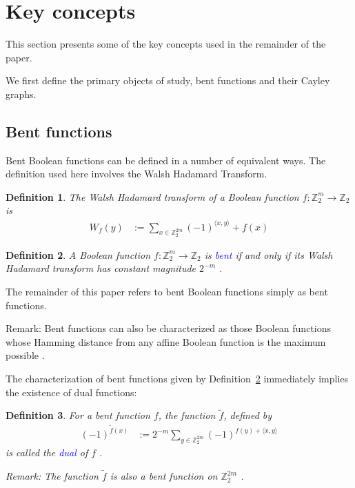 \documentclass[12pt,a4paper]{article}
\newcommand{\mb}[1]{\mathbb{#1}}
\newcommand{\Z}{\mb{Z}}
\newcommand{\To}{\rightarrow}
\newcommand{\Emph}[1]{\emph{\textcolor{blue}{#1}}}
\newcommand{\dual}[1]{\widetilde{#1}}
\newtheorem{Definition}{Definition}
\begin{document}
\section{Key concepts}
\label{sec-Preliminaries}

This section presents some of the key concepts used in the remainder of the paper.

We first define the primary objects of study, bent functions and their Cayley graphs.

\subsection{Bent functions}

Bent Boolean functions can be defined in a number of equivalent ways.
The definition used here involves the Walsh Hadamard Transform.
\begin{Definition}
\label{def-Walsh-Hadamard-transform}
The Walsh Hadamard transform of
a Boolean function $f : \Z_2^m \To \Z_2$ is
\begin{align*}
W_f(y)
&:=
\sum_{x \in \Z_2^{2 m}} (-1)^{\langle x, y \rangle} + f(x)
\end{align*}
\end{Definition}

\begin{Definition}
\label{def-Bent-function}
A Boolean function $f : \Z_2^m \To \Z_2$ is \Emph{bent}
if and only if its Walsh Hada\-mard transform has constant magnitude $2^{-m}$ \cite[p. 74]{Dil74}
\cite[p. 300]{Rot76}.
\end{Definition}

The remainder of this paper refers to bent Boolean functions simply as bent functions.

Remark: Bent functions can also be characterized as those Boolean functions whose Hamming distance
from any affine Boolean function is the maximum possible \cite[Theorem 3.3]{MeiS90}.

The characterization of bent functions given by Definition~\ref{def-Bent-function} immediately
implies the existence of dual functions:
\begin{Definition}
\label{def-dual-Bent-function}
For a bent function $f$, the function $\dual{f}$, defined by
\begin{align*}
(-1)^{\dual{f}(x)} &:= 2^{-m} \sum_{y \in \Z_2^{2m}} (-1)^{f(y) + \langle x, y \rangle}
\end{align*}
is called the \Emph{dual} of $f$ \cite{Tok11number}.

Remark: The function $\dual{f}$ is also a bent function on $\Z_2^{2m}$ \cite[p. 301]{Rot76}.
\end{Definition}
\end{document}
